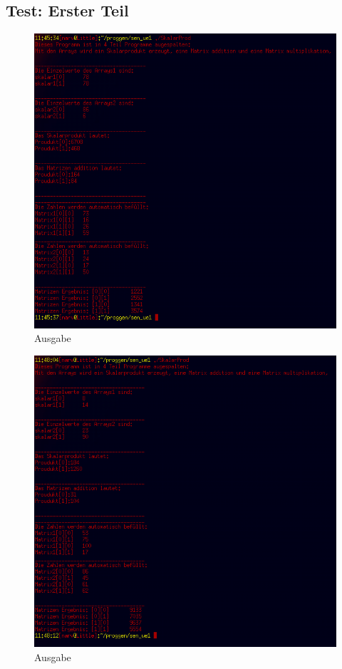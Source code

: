 \documentclass{scrartcl}
\begin{document}
\subsection{Test: Erster Teil}
\begin{figure}[H]
  \centering
  \includegraphics[width=0.9\linewidth]{images/test1.png}
  \caption{Ausgabe}
  \label{fig:digraph}
\end{figure}

\begin{figure}[H]
  \centering
  \includegraphics[width=0.9\linewidth]{images/test2.png}
  \caption{Ausgabe}
  \label{fig:digraph}
\end{figure}
\end{document}
